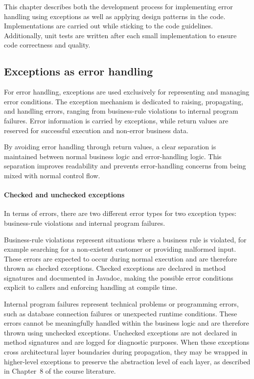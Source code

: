 \documentclass[a4paper]{scrartcl}
\begin{document}

This chapter describes both the development process for implementing error handling using exceptions as well as applying design patterns in the code. Implementations are carried out while sticking to the code guidelines. Additionally, unit tests are written after each small implementation to ensure code correctness and quality.

\subsection{Exceptions as error handling}

For error handling, exceptions are used exclusively for representing and managing error conditions. The exception mechanism is dedicated to raising, propagating, and handling errors, ranging from business-rule violations to internal program failures. Error information is carried by exceptions, while return values are reserved for successful execution and non-error business data.

By avoiding error handling through return values, a clear separation is maintained between normal business logic and error-handling logic. This separation improves readability and prevents error-handling concerns from being mixed with normal control flow.

\paragraph{Checked and unchecked exceptions}

In terms of errors, there are two different error types for two exception types: business-rule violations and internal program failures.

Business-rule violations represent situations where a business rule is violated, for example searching for a non-existent customer or providing malformed input. These errors are expected to occur during normal execution
and are therefore thrown as checked exceptions. Checked exceptions are declared in method signatures and documented in Javadoc, making the possible error conditions explicit to callers and enforcing handling at compile time.

Internal program failures represent technical problems or programming errors, such as database connection failures or unexpected runtime conditions. These errors cannot be meaningfully handled within the business logic and are therefore thrown using unchecked exceptions. Unchecked exceptions are not declared in method signatures and are logged for diagnostic purposes. When these exceptions cross architectural layer boundaries during propagation, they may be wrapped in higher-level exceptions to preserve the abstraction level of each layer, as described in Chapter~8 of the course literature.
\end{document}
